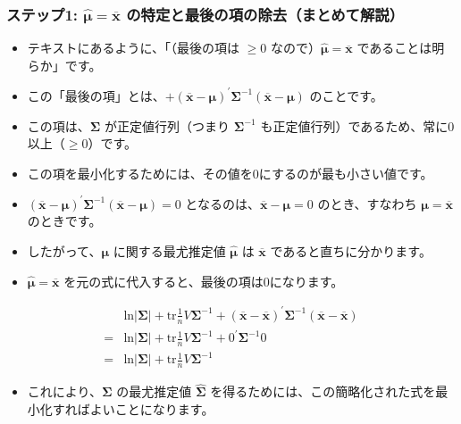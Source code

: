 \documentclass{beamer}
\begin{document}
\begin{frame}[t]
\frametitle{ステップ1: $\hat{\bm{\mu}}=\overline{\bm{x}}$ の特定と最後の項の除去（まとめて解説）}
\small
\begin{itemize}
    \item テキストにあるように、「（最後の項は $\ge0$ なので）$\hat{\bm{\mu}}=\overline{\bm{x}}$ であることは明らか」です。
    \item この「最後の項」とは、$+(\overline{\bm{x}}-\bm{\mu})^{\prime}\bm{\Sigma}^{-1}(\overline{\bm{x}}-\bm{\mu})$ のことです。
    \item この項は、$\bm{\Sigma}$ が正定値行列（つまり $\bm{\Sigma}^{-1}$ も正定値行列）であるため、常に0以上（$\ge0$）です。
    \item この項を最小化するためには、その値を0にするのが最も小さい値です。
    \item $(\overline{\bm{x}}-\bm{\mu})^{\prime}\bm{\Sigma}^{-1}(\overline{\bm{x}}-\bm{\mu})=0$ となるのは、$\overline{\bm{x}}-\bm{\mu}=0$ のとき、すなわち $\bm{\mu}=\overline{\bm{x}}$ のときです。
    \item したがって、$\bm{\mu}$ に関する最尤推定値 $\hat{\bm{\mu}}$ は $\overline{\bm{x}}$ であると直ちに分かります。
    \item $\hat{\bm{\mu}}=\overline{\bm{x}}$ を元の式に代入すると、最後の項は0になります。
\end{itemize}
\begin{align*}
&\text{ln}|\bm{\Sigma}|+\text{tr}\frac{1}{n}V\bm{\Sigma}^{-1}+(\overline{\bm{x}}-\overline{\bm{x}})^{\prime}\bm{\Sigma}^{-1}(\overline{\bm{x}}-\overline{\bm{x}}) \\
=&\text{ln}|\bm{\Sigma}|+\text{tr}\frac{1}{n}V\bm{\Sigma}^{-1}+0^{\prime}\bm{\Sigma}^{-1}0 \\
=&\text{ln}|\bm{\Sigma}|+\text{tr}\frac{1}{n}V\bm{\Sigma}^{-1}
\end{align*}
\begin{itemize}
    \item これにより、$\bm{\Sigma}$ の最尤推定値 $\hat{\bm{\Sigma}}$ を得るためには、この簡略化された式を最小化すればよいことになります。
\end{itemize}
\end{frame}
\end{document}
